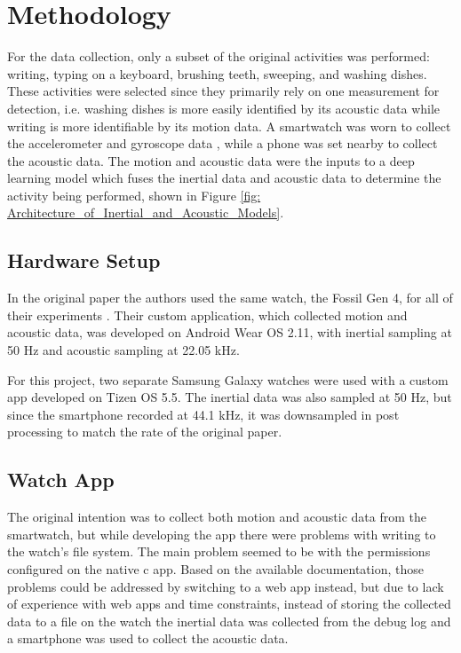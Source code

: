 \documentclass[conference]{IEEEtran}
\begin{document}
	\section{Methodology}
	For the data collection, only a subset of the original activities was performed: writing, typing on a keyboard, brushing teeth, sweeping, and washing dishes.
	These activities were selected since they primarily rely on one measurement for detection, i.e. washing dishes is more easily identified by its acoustic data while writing is more identifiable by its motion data.
	A smartwatch was worn to collect the accelerometer and gyroscope data \cite{2020_Accelerometer_and_Gyroscope}, while a phone was set nearby to collect the acoustic data.
	The motion and acoustic data were the inputs to a deep learning model which fuses the inertial data and acoustic data to determine the activity being performed, shown in Figure \ref{fig: Architecture_of_Inertial_and_Acoustic_Models}.
	
	\subsection{Hardware Setup}
	In the original paper the authors used the same watch, the Fossil Gen 4, for all of their experiments \cite{2022_Leveraging_sound}.
	Their custom application, which collected motion and acoustic data, was developed on Android Wear OS 2.11, with inertial sampling at 50 Hz and acoustic sampling at 22.05 kHz.
	
	For this project, two separate Samsung Galaxy watches were used with a custom app developed on Tizen OS 5.5.
	The inertial data was also sampled at 50 Hz, but since the smartphone recorded at 44.1 kHz, it was downsampled in post processing to match the rate of the original paper.
	
	\subsection{Watch App}
	The original intention was to collect both motion and acoustic data from the smartwatch, but while developing the app there were problems with writing to the watch's file system.
	The main problem seemed to be with the permissions configured on the native c app.
	Based on the available documentation, those problems could be addressed by switching to a web app instead, but due to lack of experience with web apps and time constraints, instead of storing the collected data to a file on the watch the inertial data was collected from the debug log and a smartphone was used to collect the acoustic data.
	
\end{document}
